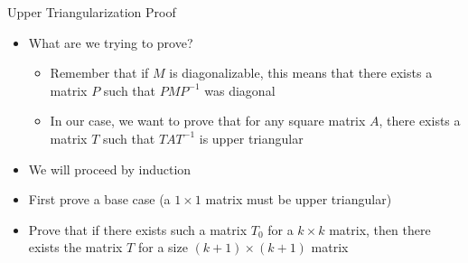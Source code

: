 \begin{frame}{Upper Triangularization Proof}
    \begin{itemize}
        \item What are we trying to prove?
            \begin{itemize}
                \item
                    Remember that if \(M\) is diagonalizable, this means that there exists a matrix \(P\) such that \(PMP^{-1}\) was diagonal
                \item In our case, we want to prove that for any square matrix \(A\), there exists a matrix \(T\) such that \(TAT^{-1}\) is upper triangular
            \end{itemize}
        \item We will proceed by induction
        \item First prove a base case (a \(1 \times 1\) matrix must be upper triangular)
        \item  Prove that if there exists such a matrix \(T_0\) for a \(k \times k\) matrix, then there exists the matrix \(T\) for a size \((k+1) \times (k+1)\) matrix
    \end{itemize}
\end{frame}

